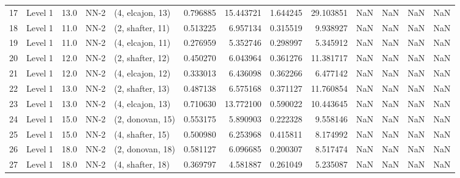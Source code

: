 \begin{tabular}{llrllrrrrrrrr}
17 &   Level 1 &   13.0 &        NN-2 &  (4, elcajon, 13) &   0.796885 &  15.443721 &  1.644245 &  29.103851 &                  NaN &                    NaN &                 NaN &                   NaN \\
18 &   Level 1 &   11.0 &        NN-2 &  (2, shafter, 11) &   0.513225 &   6.957134 &  0.315519 &   9.938927 &                  NaN &                    NaN &                 NaN &                   NaN \\
19 &   Level 1 &   11.0 &        NN-2 &  (4, elcajon, 11) &   0.276959 &   5.352746 &  0.298997 &   5.345912 &                  NaN &                    NaN &                 NaN &                   NaN \\
20 &   Level 1 &   12.0 &        NN-2 &  (2, shafter, 12) &   0.450270 &   6.043964 &  0.361276 &  11.381717 &                  NaN &                    NaN &                 NaN &                   NaN \\
21 &   Level 1 &   12.0 &        NN-2 &  (4, elcajon, 12) &   0.333013 &   6.436098 &  0.362266 &   6.477142 &                  NaN &                    NaN &                 NaN &                   NaN \\
22 &   Level 1 &   13.0 &        NN-2 &  (2, shafter, 13) &   0.487138 &   6.575168 &  0.371127 &  11.760854 &                  NaN &                    NaN &                 NaN &                   NaN \\
23 &   Level 1 &   13.0 &        NN-2 &  (4, elcajon, 13) &   0.710630 &  13.772100 &  0.590022 &  10.443645 &                  NaN &                    NaN &                 NaN &                   NaN \\
24 &   Level 1 &   15.0 &        NN-2 &  (2, donovan, 15) &   0.553175 &   5.890903 &  0.222328 &   9.558146 &                  NaN &                    NaN &                 NaN &                   NaN \\
25 &   Level 1 &   15.0 &        NN-2 &  (4, shafter, 15) &   0.500980 &   6.253968 &  0.415811 &   8.174992 &                  NaN &                    NaN &                 NaN &                   NaN \\
26 &   Level 1 &   18.0 &        NN-2 &  (2, donovan, 18) &   0.581127 &   6.096685 &  0.200307 &   8.517474 &                  NaN &                    NaN &                 NaN &                   NaN \\
27 &   Level 1 &   18.0 &        NN-2 &  (4, shafter, 18) &   0.369797 &   4.581887 &  0.261049 &   5.235087 &                  NaN &                    NaN &                 NaN &                   NaN \\

\end{tabular}

